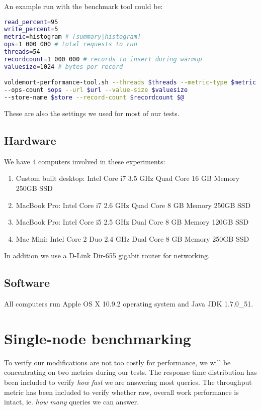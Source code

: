 An example run with the benchmark tool could be:
\begin{lstlisting}[language=bash]
read_percent=95
write_percent=5
metric=histogram # [summary|histogram]
ops=1 000 000 # total requests to run
threads=54
recordcount=1 000 000 # records to insert during warmup
valuesize=1024 # bytes per record

voldemort-performance-tool.sh --threads $threads --metric-type $metric 
--ops-count $ops --url $url --value-size $valuesize 
--store-name $store --record-count $recordcount $@
\end{lstlisting}

These are also the settings we used for most of our tests.

\subsection{Hardware}
We have 4 computers involved in these experiments:

\begin{enumerate}
	\item Custom built desktop: Intel Core i7 3.5 GHz Quad Core  16 GB Memory 250GB SSD
	\item MacBook Pro: Intel Core i7 2.6 GHz Quad Core 8 GB Memory 250GB SSD
	\item MacBook Pro: Intel Core i5 2.5 GHz Dual Core 8 GB Memory 120GB SSD
	\item Mac Mini: Intel Core 2 Duo 2.4 GHz Dual Core 8 GB Memory 250GB SSD
\end{enumerate}

In addition we use a D-Link Dir-655 gigabit router for networking.

\subsection{Software}
All computers run Apple OS X 10.9.2 operating system and Java JDK 1.7.0\_51. 

\section{Single-node benchmarking}
To verify our modifications are not too costly for performance, we will be concentrating on two metrics during our tests. The response time distribution has been included to verify \emph{how fast} we are answering most queries. The throughput metric has been included to verify whether raw, overall work performance is intact, ie. \emph{how many} queries we can answer.


